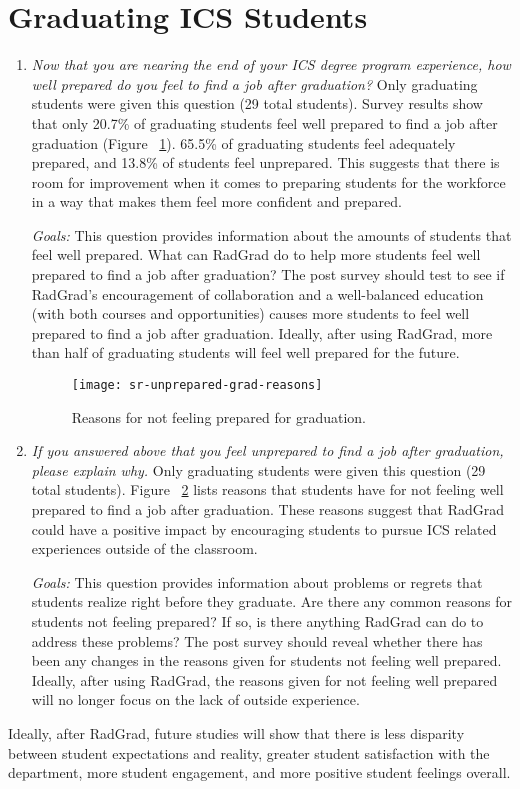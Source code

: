 \section{Graduating ICS Students}
\begin{enumerate}
\begin{figure}[h]
\centering
\texttt{[image: sr-prepared]}
\caption{Results for graduation preparedness.}
\label{prepared-grad}
\end{figure}
\item \textit{Now that you are nearing the end of your ICS degree program experience, how well prepared do you feel to find a job after graduation?}
Only graduating students were given this question (29 total students). Survey results show that only 20.7\% of graduating students feel well prepared to find a job after graduation (Figure ~\ref{prepared-grad}). 65.5\% of graduating students feel adequately prepared, and 13.8\% of students feel unprepared. This suggests that there is room for improvement when it comes to preparing students for the workforce in a way that makes them feel more confident and prepared. 

\textit{Goals:} This question provides information about the amounts of students that feel well prepared. What can RadGrad do to help more students feel well prepared to find a job after graduation? The post survey should test to see if RadGrad's encouragement of collaboration and a well-balanced education (with both courses and opportunities) causes more students to feel well prepared to find a job after graduation. Ideally, after using RadGrad, more than half of graduating students will feel well prepared for the future.

\begin{figure}[h]
\centering
\texttt{[image: sr-unprepared-grad-reasons]}
\caption{Reasons for not feeling prepared for graduation.}
\label{reasons}
\end{figure}
\item \textit{If you answered above that you feel unprepared to find a job after graduation, please explain why. }
Only graduating students were given this question (29 total students). Figure ~\ref{reasons} lists reasons that students have for not feeling well prepared to find a job after graduation. These reasons suggest that RadGrad could have a positive impact by encouraging students to pursue ICS related experiences outside of the classroom.

\textit{Goals:} This question provides information about problems or regrets that students realize right before they graduate. Are there any common reasons for students not feeling prepared? If so, is there anything RadGrad can do to address these problems? The post survey should reveal whether there has been any changes in the reasons given for students not feeling well prepared. Ideally, after using RadGrad, the reasons given for not feeling well prepared will no longer focus on the lack of outside experience. 

\end{enumerate}

Ideally, after RadGrad, future studies will show that there is less disparity between student expectations and reality, greater student satisfaction with the department, more student engagement, and more positive student feelings overall.


